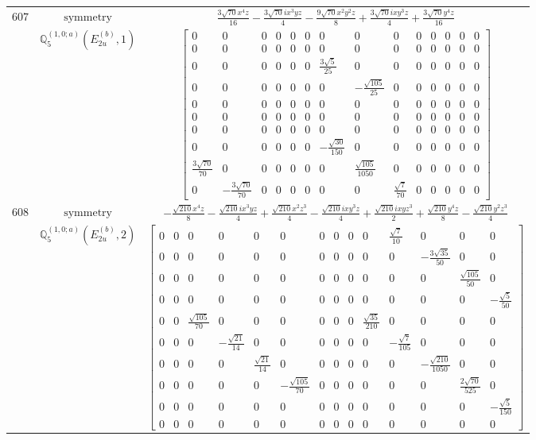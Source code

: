 \documentclass[fleqn,8pt,landscape]{jsarticle}
\begin{document}
\begin{longtable}{ccc}
$ 607 $ & $ \text{symmetry} $ & $ \frac{3 \sqrt{70} x^{4} z}{16} - \frac{3 \sqrt{70} i x^{3} y z}{4} - \frac{9 \sqrt{70} x^{2} y^{2} z}{8} + \frac{3 \sqrt{70} i x y^{3} z}{4} + \frac{3 \sqrt{70} y^{4} z}{16} $ \\
$  $ & $ \mathbb{Q}_{5}^{(1,0;a)}(E_{2u}^{(b)},1) $ & $ \begin{bmatrix} 0 & 0 & 0 & 0 & 0 & 0 & 0 & 0 & 0 & 0 & 0 & 0 & 0 & 0 \\ 0 & 0 & 0 & 0 & 0 & 0 & 0 & 0 & 0 & 0 & 0 & 0 & 0 & 0 \\ 0 & 0 & 0 & 0 & 0 & 0 & \frac{3 \sqrt{5}}{25} & 0 & 0 & 0 & 0 & 0 & 0 & 0 \\ 0 & 0 & 0 & 0 & 0 & 0 & 0 & - \frac{\sqrt{105}}{25} & 0 & 0 & 0 & 0 & 0 & 0 \\ 0 & 0 & 0 & 0 & 0 & 0 & 0 & 0 & 0 & 0 & 0 & 0 & 0 & 0 \\ 0 & 0 & 0 & 0 & 0 & 0 & 0 & 0 & 0 & 0 & 0 & 0 & 0 & 0 \\ 0 & 0 & 0 & 0 & 0 & 0 & 0 & 0 & 0 & 0 & 0 & 0 & 0 & 0 \\ 0 & 0 & 0 & 0 & 0 & 0 & - \frac{\sqrt{30}}{150} & 0 & 0 & 0 & 0 & 0 & 0 & 0 \\ \frac{3 \sqrt{70}}{70} & 0 & 0 & 0 & 0 & 0 & 0 & \frac{\sqrt{105}}{1050} & 0 & 0 & 0 & 0 & 0 & 0 \\ 0 & - \frac{3 \sqrt{70}}{70} & 0 & 0 & 0 & 0 & 0 & 0 & \frac{\sqrt{7}}{70} & 0 & 0 & 0 & 0 & 0 \end{bmatrix} $ \\ \hline
$ 608 $ & $ \text{symmetry} $ & $ - \frac{\sqrt{210} x^{4} z}{8} - \frac{\sqrt{210} i x^{3} y z}{4} + \frac{\sqrt{210} x^{2} z^{3}}{4} - \frac{\sqrt{210} i x y^{3} z}{4} + \frac{\sqrt{210} i x y z^{3}}{2} + \frac{\sqrt{210} y^{4} z}{8} - \frac{\sqrt{210} y^{2} z^{3}}{4} $ \\
$  $ & $ \mathbb{Q}_{5}^{(1,0;a)}(E_{2u}^{(b)},2) $ & $ \begin{bmatrix} 0 & 0 & 0 & 0 & 0 & 0 & 0 & 0 & 0 & 0 & \frac{\sqrt{7}}{10} & 0 & 0 & 0 \\ 0 & 0 & 0 & 0 & 0 & 0 & 0 & 0 & 0 & 0 & 0 & - \frac{3 \sqrt{35}}{50} & 0 & 0 \\ 0 & 0 & 0 & 0 & 0 & 0 & 0 & 0 & 0 & 0 & 0 & 0 & \frac{\sqrt{105}}{50} & 0 \\ 0 & 0 & 0 & 0 & 0 & 0 & 0 & 0 & 0 & 0 & 0 & 0 & 0 & - \frac{\sqrt{5}}{50} \\ 0 & 0 & \frac{\sqrt{105}}{70} & 0 & 0 & 0 & 0 & 0 & 0 & \frac{\sqrt{35}}{210} & 0 & 0 & 0 & 0 \\ 0 & 0 & 0 & - \frac{\sqrt{21}}{14} & 0 & 0 & 0 & 0 & 0 & 0 & - \frac{\sqrt{7}}{105} & 0 & 0 & 0 \\ 0 & 0 & 0 & 0 & \frac{\sqrt{21}}{14} & 0 & 0 & 0 & 0 & 0 & 0 & - \frac{\sqrt{210}}{1050} & 0 & 0 \\ 0 & 0 & 0 & 0 & 0 & - \frac{\sqrt{105}}{70} & 0 & 0 & 0 & 0 & 0 & 0 & \frac{2 \sqrt{70}}{525} & 0 \\ 0 & 0 & 0 & 0 & 0 & 0 & 0 & 0 & 0 & 0 & 0 & 0 & 0 & - \frac{\sqrt{5}}{150} \\ 0 & 0 & 0 & 0 & 0 & 0 & 0 & 0 & 0 & 0 & 0 & 0 & 0 & 0 \end{bmatrix} $ \\ \hline

\end{longtable}
\end{document}
